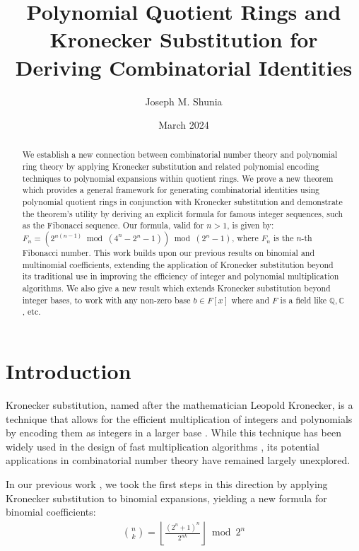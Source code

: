 \documentclass[12pt,reqno]{article}
\theoremstyle{plain}
\theoremstyle{definition}
\begin{document}
\title{Polynomial Quotient Rings and Kronecker Substitution for Deriving Combinatorial Identities}
\author{Joseph M. Shunia}
\date{March 2024}

\maketitle

\begin{abstract}
We establish a new connection between combinatorial number theory and polynomial ring theory by applying Kronecker substitution and related polynomial encoding techniques to polynomial expansions within quotient rings. We prove a new theorem which provides a general framework for generating combinatorial identities using polynomial quotient rings in conjunction with Kronecker substitution and demonstrate the theorem's utility by deriving an explicit formula for famous integer sequences, such as the Fibonacci sequence. Our formula, valid for $n > 1$, is given by: $F_n = (2^{n (n - 1)} \bmod{(4^n-2^n-1)}) \bmod{(2^n-1)}$, where $F_n$ is the $n$-th Fibonacci number. This work builds upon our previous results on binomial and multinomial coefficients, extending the application of Kronecker substitution beyond its traditional use in improving the efficiency of integer and polynomial multiplication algorithms. We also give a new result which extends Kronecker substitution beyond integer bases, to work with any non-zero base $b \in F[x]$ where and $F$ is a field like $\mathbb{Q}, \mathbb{C}$, etc.
\end{abstract}

\section{Introduction}
Kronecker substitution, named after the mathematician Leopold Kronecker, is a technique that allows for the efficient multiplication of integers and polynomials by encoding them as integers in a larger base \cite{kronecker1882}. While this technique has been widely used in the design of fast multiplication algorithms \cite{harvey2009kronecker, harvey2014faster}, its potential applications in combinatorial number theory have remained largely unexplored.

In our previous work \cite{shunia2023simple}, we took the first steps in this direction by applying Kronecker substitution to binomial expansions, yielding a new formula for binomial coefficients:
\begin{align*}
    \binom{n}{k} = \left\lfloor \frac{(2^n+1)^n}{2^{n k}} \right\rfloor \bmod{2^n}
\end{align*}
\end{document}
